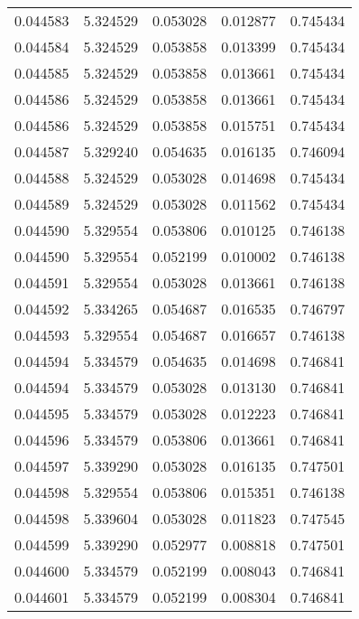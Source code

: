 \begin{tabular}{lrrrr}
0.044583    &  5.324529 &  0.053028 &  0.012877 &             0.745434 \\
0.044584    &  5.324529 &  0.053858 &  0.013399 &             0.745434 \\
0.044585    &  5.324529 &  0.053858 &  0.013661 &             0.745434 \\
0.044586    &  5.324529 &  0.053858 &  0.013661 &             0.745434 \\
0.044586    &  5.324529 &  0.053858 &  0.015751 &             0.745434 \\
0.044587    &  5.329240 &  0.054635 &  0.016135 &             0.746094 \\
0.044588    &  5.324529 &  0.053028 &  0.014698 &             0.745434 \\
0.044589    &  5.324529 &  0.053028 &  0.011562 &             0.745434 \\
0.044590    &  5.329554 &  0.053806 &  0.010125 &             0.746138 \\
0.044590    &  5.329554 &  0.052199 &  0.010002 &             0.746138 \\
0.044591    &  5.329554 &  0.053028 &  0.013661 &             0.746138 \\
0.044592    &  5.334265 &  0.054687 &  0.016535 &             0.746797 \\
0.044593    &  5.329554 &  0.054687 &  0.016657 &             0.746138 \\
0.044594    &  5.334579 &  0.054635 &  0.014698 &             0.746841 \\
0.044594    &  5.334579 &  0.053028 &  0.013130 &             0.746841 \\
0.044595    &  5.334579 &  0.053028 &  0.012223 &             0.746841 \\
0.044596    &  5.334579 &  0.053806 &  0.013661 &             0.746841 \\
0.044597    &  5.339290 &  0.053028 &  0.016135 &             0.747501 \\
0.044598    &  5.329554 &  0.053806 &  0.015351 &             0.746138 \\
0.044598    &  5.339604 &  0.053028 &  0.011823 &             0.747545 \\
0.044599    &  5.339290 &  0.052977 &  0.008818 &             0.747501 \\
0.044600    &  5.334579 &  0.052199 &  0.008043 &             0.746841 \\
0.044601    &  5.334579 &  0.052199 &  0.008304 &             0.746841 \\

\end{tabular}
